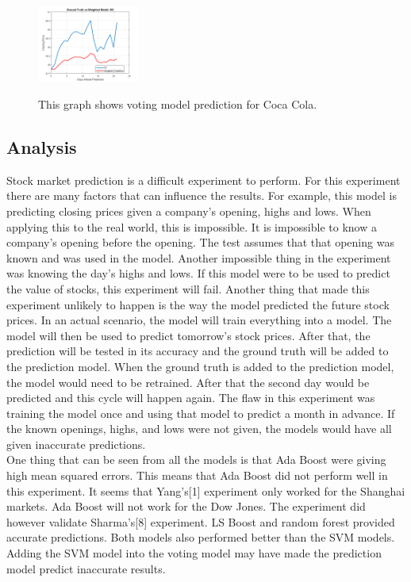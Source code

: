 \documentclass[journal]{IEEEtran}
\begin{document}
\begin{figure}[H]
\centering
\includegraphics[width = 0.3\textwidth]{ko.png}
\label{msft}
\caption{This graph shows voting model prediction for Coca Cola.}
\end{figure}

\subsection*{Analysis}
Stock market prediction is a difficult experiment to perform. For this experiment there are many factors that can influence the results. For example, this model is predicting closing prices given a company's opening, highs and lows. When applying this to the real world, this is impossible. It is impossible to know a company's opening before the opening. The test assumes that that opening was known and was used in the model. Another impossible thing in the experiment was knowing the day's highs and lows. If this model were to be used to predict the value of stocks, this experiment will fail. Another thing that made this experiment unlikely to happen is the way the model predicted the future stock prices. In an actual scenario, the model will train everything into a model. The model will then be used to predict tomorrow's stock prices. After that, the prediction will be tested in its accuracy and the ground truth will be added to the prediction model. When the ground truth is added to the prediction model, the model would need to be retrained. After that the second day would be predicted and this cycle will happen again. The flaw in this experiment was training the model once and using that model to predict a month in advance. If the known openings, highs, and lows were not given, the models would have all given inaccurate predictions.\\

One thing that can be seen from all the models is that Ada Boost were giving high mean squared errors. This means that Ada Boost did not perform well in this experiment. It seems that Yang's[1] experiment only worked for the Shanghai markets. Ada Boost will not work for the Dow Jones. The experiment did however validate Sharma's[8] experiment. LS Boost and random forest provided accurate predictions. Both models also performed better than the SVM models. Adding the SVM model into the voting model may have made the prediction model predict inaccurate results. \\
\end{document}
